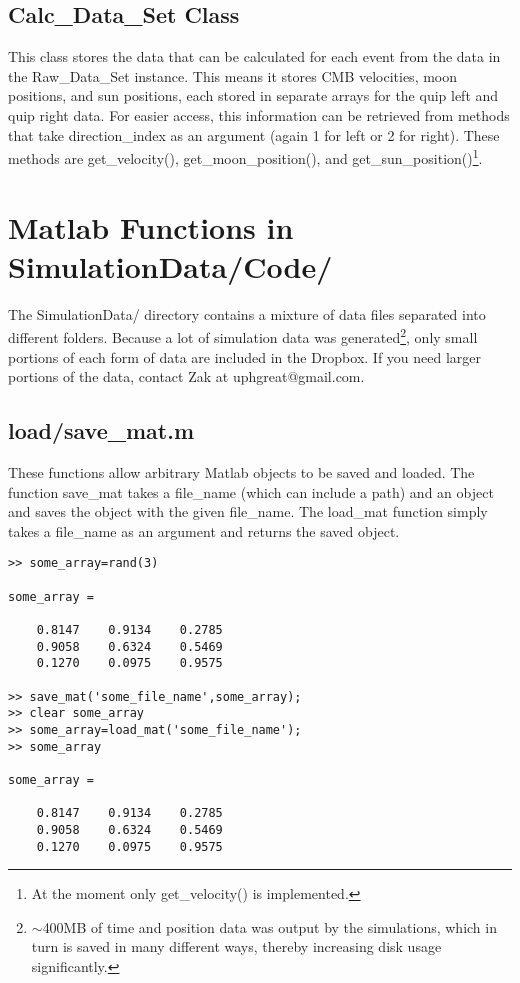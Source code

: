 \documentclass[12pt]{report}
\begin{document}
\section{Calc\_Data\_Set Class}
This class stores the data that can be calculated for each event from the data in the Raw\_Data\_Set instance.  This means it stores CMB velocities, moon positions, and sun positions, each stored in separate arrays for the quip left and quip right data.  For easier access, this information can be retrieved from methods that take direction\_index as an argument (again 1 for left or 2 for right).  These methods are get\_velocity(), get\_moon\_position(), and get\_sun\_position()\footnote{At the moment only get\_velocity() is implemented.}.





\chapter{Matlab Functions in SimulationData/Code/}
The SimulationData/ directory contains a mixture of data files separated into different folders.  Because a lot of simulation data was generated\footnote{${\sim}$400MB of time and position data was output by the simulations, which in turn is saved in many different ways, thereby increasing disk usage significantly.}, only small portions of each form of data are included in the Dropbox.  If you need larger portions of the data, contact Zak at uphgreat@gmail.com.

\section{load/save\_mat.m}
These functions allow arbitrary Matlab objects to be saved and loaded.  The function save\_mat takes a file\_name (which can include a path) and an object and saves the object with the given file\_name.  The load\_mat function simply takes a file\_name as an argument and returns the saved object.

\begin{verbatim}
>> some_array=rand(3)

some_array =

    0.8147    0.9134    0.2785
    0.9058    0.6324    0.5469
    0.1270    0.0975    0.9575

>> save_mat('some_file_name',some_array);
>> clear some_array
>> some_array=load_mat('some_file_name');
>> some_array

some_array =

    0.8147    0.9134    0.2785
    0.9058    0.6324    0.5469
    0.1270    0.0975    0.9575
\end{verbatim}
\end{document}
